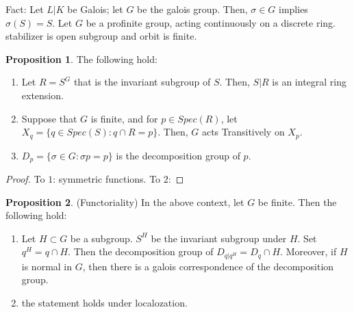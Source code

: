 \documentclass{article}
\theoremstyle{definition}
\theoremstyle{definition}
\theoremstyle{definition}
\newtheorem{proposition}{Proposition}[section]
\theoremstyle{definition}
\theoremstyle{definition}
\theoremstyle{definition}
\theoremstyle{definition}
\begin{document}
Fact: Let $L|K$ be Galois; let $G$ be the galois group. Then, $\sigma\in G$ implies $\sigma(S)=S$. Let $G$ be a profinite group, acting continuously on a discrete ring. stabilizer is open subgroup and orbit is finite. 


\begin{tcolorbox}[colback=blue!5!white,colframe=blue!30!white]
\begin{proposition}
The following hold: 
\begin{enumerate}
    \item Let $R=S^G$ that is the invariant subgroup of $S$. Then, $S|R$ is an integral ring extension. 
    \item Suppose that $G$ is finite, and for $p\in Spec(R)$, let $X_q=\{ q\in Spec(S):q\cap R=p \}$. Then, $G$ acts Transitively on $X_p$.
    \item $D_p=\{ \sigma\in G:\sigma p =p  \}$ is the decomposition group of $p$. 
\end{enumerate}
\end{proposition}
\end{tcolorbox}
\begin{proof}
    To $1$: symmetric functions. To $2$: 
\end{proof}


\begin{tcolorbox}[colback=blue!5!white,colframe=blue!30!white]
\begin{proposition}
(Functoriality) In the above context, let $G$ be finite. Then the following hold:
\begin{enumerate}
    \item Let $H\subset G$ be a subgroup. $S^H$ be the invariant subgroup under $H$. Set $q^H=q\cap H$. Then the decomposition group of $D_{q|q^H}=D_q\cap H$. Moreover, if $H$ is normal in $G$, then there is a galois correspondence of the decomposition group.
    \item the statement holds under localozation. 
\end{enumerate} 
\end{proposition}
\end{tcolorbox}
\end{document}
